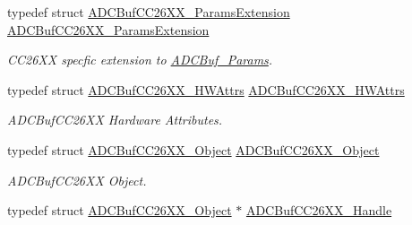 \begin{DoxyCompactItemize}
typedef struct \hyperlink{struct_a_d_c_buf_c_c26_x_x___params_extension}{A\+D\+C\+Buf\+C\+C26\+X\+X\+\_\+\+Params\+Extension} \hyperlink{_a_d_c_buf_c_c26_x_x_8h_afac55b5d59cd880fecafb9a71f73162b}{A\+D\+C\+Buf\+C\+C26\+X\+X\+\_\+\+Params\+Extension}
\begin{DoxyCompactList}\small\item\em C\+C26\+X\+X specfic extension to \hyperlink{struct_a_d_c_buf___params}{A\+D\+C\+Buf\+\_\+\+Params}. \end{DoxyCompactList}\item 
typedef struct \hyperlink{struct_a_d_c_buf_c_c26_x_x___h_w_attrs}{A\+D\+C\+Buf\+C\+C26\+X\+X\+\_\+\+H\+W\+Attrs} \hyperlink{_a_d_c_buf_c_c26_x_x_8h_a22b04734af9e7cbaa1915f92942918fc}{A\+D\+C\+Buf\+C\+C26\+X\+X\+\_\+\+H\+W\+Attrs}
\begin{DoxyCompactList}\small\item\em A\+D\+C\+Buf\+C\+C26\+X\+X Hardware Attributes. \end{DoxyCompactList}\item 
typedef struct \hyperlink{struct_a_d_c_buf_c_c26_x_x___object}{A\+D\+C\+Buf\+C\+C26\+X\+X\+\_\+\+Object} \hyperlink{_a_d_c_buf_c_c26_x_x_8h_a7963f859847ffe0853c06219b63ceb42}{A\+D\+C\+Buf\+C\+C26\+X\+X\+\_\+\+Object}
\begin{DoxyCompactList}\small\item\em A\+D\+C\+Buf\+C\+C26\+X\+X Object. \end{DoxyCompactList}\item 
typedef struct \hyperlink{struct_a_d_c_buf_c_c26_x_x___object}{A\+D\+C\+Buf\+C\+C26\+X\+X\+\_\+\+Object} $\ast$ \hyperlink{_a_d_c_buf_c_c26_x_x_8h_a1bd07a1b826d70701a49d7d951152504}{A\+D\+C\+Buf\+C\+C26\+X\+X\+\_\+\+Handle}
\end{DoxyCompactItemize}

